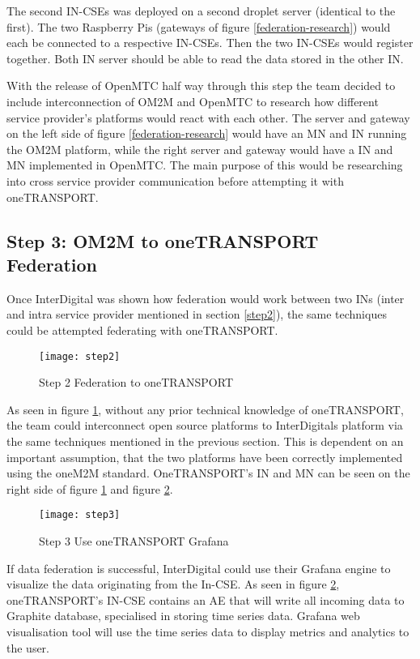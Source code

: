 The second IN-CSEs was deployed on a second droplet server (identical to the first). The two Raspberry Pis (gateways of figure \ref{federation-research}) would each be connected to a respective IN-CSEs. Then the two IN-CSEs would register together. Both IN server should be able to read the data stored in the other IN. 

With the release of OpenMTC half way through this step the team decided to include interconnection of OM2M and OpenMTC to research how different service provider's platforms would react with each other. The server and gateway on the left side of figure \ref{federation-research} would have an MN and IN running the OM2M platform, while the right server and gateway would have a IN and MN implemented in OpenMTC. The main purpose of this would be researching into cross service provider communication before attempting it with oneTRANSPORT.  

\subsection{Step 3: OM2M to oneTRANSPORT Federation}
\label{step3}

Once InterDigital was shown how federation would work between two INs (inter and intra service provider mentioned in section \ref{step2}), the same techniques could be attempted federating with oneTRANSPORT.

\begin{figure}[H]
  \centering
  \texttt{[image: step2]}
  \caption{Step 2 Federation to oneTRANSPORT}
  \label{federation-to-ontransport}
\end{figure}

As seen in figure \ref{federation-to-ontransport}, without any prior technical knowledge of oneTRANSPORT, the team could interconnect open source platforms to InterDigitals platform via the same techniques mentioned in the previous section. This is dependent on an important assumption, that the two platforms have been correctly implemented using the oneM2M standard. OneTRANSPORT's IN and MN can be seen on the right side of figure \ref{federation-to-ontransport} and figure \ref{use-onetransport-grafana}.
\begin{figure}[H]
  \centering
  \texttt{[image: step3]}
  \caption{Step 3 Use oneTRANSPORT Grafana}
  \label{use-onetransport-grafana}
\end{figure}

If data federation is successful, InterDigital could use their Grafana \cite{Grafana2018GrafanaMonitoring} engine to visualize the data originating from the In-CSE. As seen in figure \ref{use-onetransport-grafana}, oneTRANSPORT's IN-CSE contains an AE that will write all incoming data to Graphite \cite{Graphite2018Graphite} database, specialised in storing time series data. Grafana web visualisation tool will use the time series data to display metrics and analytics to the user.


